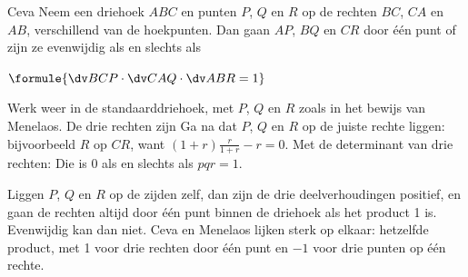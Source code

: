 \begin{theorie}
\begin{stelling}{Ceva}
Neem een driehoek $ABC$ en punten $P$, $Q$ en $R$ op de rechten $BC$, $CA$ en $AB$, verschillend van de hoekpunten. Dan gaan $AP$, $BQ$ en $CR$ door één punt of zijn ze evenwijdig als en slechts als

\vspace{1mm}
\qquad $\formule{\dv BCP \cdot \dv CAQ \cdot \dv ABR = 1}$
\end{stelling}

\begin{bewijs}
Werk weer in de standaarddriehoek, met $P$, $Q$ en $R$ zoals in het bewijs van Menelaos. De drie rechten zijn
Ga na dat $P$, $Q$ en $R$ op de juiste rechte liggen: bijvoorbeeld $R$ op $CR$, want $(1 + r)\tfrac{r}{1 + r} - r = 0$. Met de determinant van drie rechten:
Die is 0 als en slechts als $pqr = 1$.
\end{bewijs}
\end{theorie}

Liggen $P$, $Q$ en $R$ op de zijden zelf, dan zijn de drie deelverhoudingen positief, en gaan de rechten altijd door één punt binnen de driehoek als het product 1 is. Evenwijdig kan dan niet. Ceva en Menelaos lijken sterk op elkaar: hetzelfde product, met 1 voor drie rechten door één punt en $-1$ voor drie punten op één rechte.


